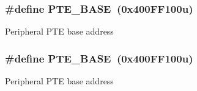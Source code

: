\subsubsection[{\texorpdfstring{P\+T\+E\+\_\+\+B\+A\+SE}{PTE_BASE}}]{\setlength{\rightskip}{0pt plus 5cm}\#define P\+T\+E\+\_\+\+B\+A\+SE~(0x400\+F\+F100u)}\hypertarget{group__GPIO__Peripheral__Access__Layer_gaac65442c7407ccb219eea68a45c2bdc6}{}\label{group__GPIO__Peripheral__Access__Layer_gaac65442c7407ccb219eea68a45c2bdc6}
Peripheral P\+TE base address 
\subsubsection[{\texorpdfstring{P\+T\+E\+\_\+\+B\+A\+SE}{PTE_BASE}}]{\setlength{\rightskip}{0pt plus 5cm}\#define P\+T\+E\+\_\+\+B\+A\+SE~(0x400\+F\+F100u)}\hypertarget{group__GPIO__Peripheral__Access__Layer_gaac65442c7407ccb219eea68a45c2bdc6}{}\label{group__GPIO__Peripheral__Access__Layer_gaac65442c7407ccb219eea68a45c2bdc6}
Peripheral P\+TE base address 